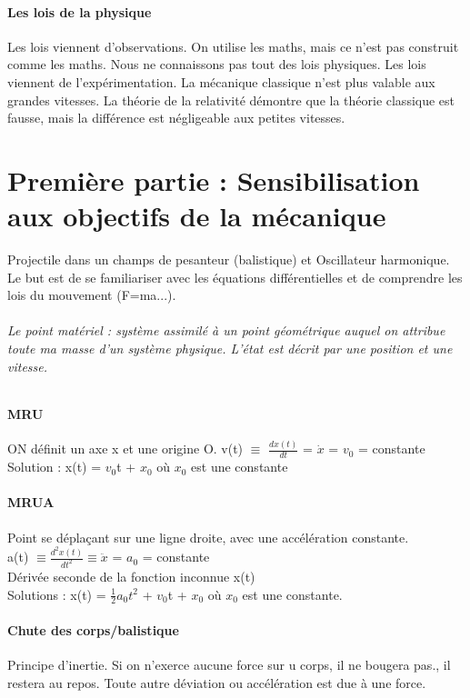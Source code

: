 \documentclass[12pt,a4paper]{article}
\begin{document}
\subsection{Les lois de la physique}
Les lois viennent d'observations. On utilise les maths, mais ce n'est pas construit comme les maths. Nous ne connaissons pas tout des lois physiques. Les lois viennent de l'expérimentation. La mécanique classique n'est plus valable aux grandes vitesses. La théorie de la relativité démontre que la théorie classique est fausse, mais la différence est négligeable aux petites vitesses.
\part{Première partie : Sensibilisation aux objectifs de la mécanique}
Projectile dans un champs de pesanteur (balistique) et Oscillateur harmonique. Le but est de se familiariser avec les équations différentielles et de comprendre les lois du mouvement (F=ma...).
\paragraph{Le point matériel : système assimilé à un point géométrique auquel on attribue toute ma masse d'un système physique. L'état est décrit par une position et une vitesse.}
\subsection{MRU}
ON définit un axe x et une origine O.
v(t) $\equiv$ $\frac{dx(t)}{dt}$ = $\dot x$ = $v_0$ = constante
\\Solution : x(t) = $v_0$t + $x_0$ où $x_0$ est une constante
\subsection{MRUA}
Point se déplaçant sur une ligne droite, avec une accélération constante.
\\ a(t) $\equiv \frac{d^2x(t)}{dt^2} \equiv \ddot x$ = $a_0$ = constante
\\ Dérivée seconde de la fonction inconnue x(t)
\\Solutions : x(t) = $\frac{1}{2} a_0t^2$ + $v_0$t + $x_0$ où $x_0$ est une constante.
\subsection{Chute des corps/balistique}
Principe d'inertie. Si on n'exerce aucune force sur u corps, il ne bougera pas., il restera au repos. Toute autre déviation ou accélération est due à une force. 
\end{document}
